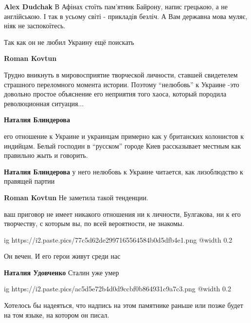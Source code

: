 \begin{itemize}
\textbf{Alex Dudchak} В Афінах стоїть пам'ятник Байрону, напис грецькою, а не англійською. І так в усьому світі - прикладів безліч. А Вам державна мова муляє, ніяк не заспокоїтесь.

Так как он не любил Украину ещё поискать

\begin{itemize} %
\textbf{Roman Kovtun} 

Трудно вникнуть в мировосприятие творческой личности, ставшей свидетелем
страшного переломного момента истории. Поэтому \enquote{нелюбовь} к Украине -это
довольно простое объяснение его неприятия того хаоса, который породила
революционная ситуация...

\begin{itemize} %
\textbf{Наталия Блиндерова} 

его отношение к Украине и украинцам примерно как у британских колонистов к
индийцам. Белый господин в \enquote{русском} городе Киев рассказывает местным как
правильно жыть и говорить.


\textbf{Наталия Блиндерова} у него нелюбовь к Украине читается, как лизоблюдство к правящей партии

\textbf{Roman Kovtun} Не заметила такой тенденции.
\end{itemize} %


ваш приговор не имеет никакого отношения ни к личности, Булгакова, ни к его
творчеству, с которым вы, по всей вероятности, не знакомы.

\end{itemize} %


\ifcmt
  ig https://i2.paste.pics/77c5d62de2997165564584b0d5dfb4e1.png
  @width 0.2
\fi

Он вечен. И его герои живут среди нас

\textbf{Наталия Удовченко} Сталин уже умер


\ifcmt
  ig https://i2.paste.pics/ac5d5e72b4d0d9ccbf0b864931c9a7c3.png
  @width 0.2
\fi



Хотелось бы надеяться, что надпись на этом памятнике раньше или позже будет на
том языке, на котором он писал.


\end{itemize}
